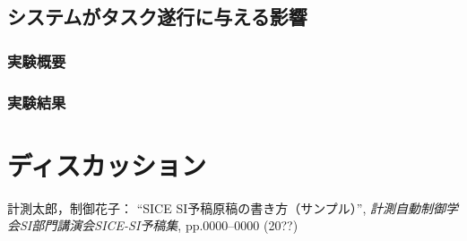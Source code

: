 \documentclass[a4paper]{jarticle}
\begin{document}
\subsection{システムがタスク遂行に与える影響}
\subsubsection{実験概要}
\subsubsection{実験結果}
\section{ディスカッション}
%
%
\begin{thebibliography}{99}
	計測太郎，制御花子：
	``SICE SI予稿原稿の書き方（サンプル）'',  
   {\it 計測自動制御学会SI部門講演会SICE-SI予稿集}, 
    pp.0000--0000 (20??)
\end{thebibliography}
%
%
%
\end{document}
